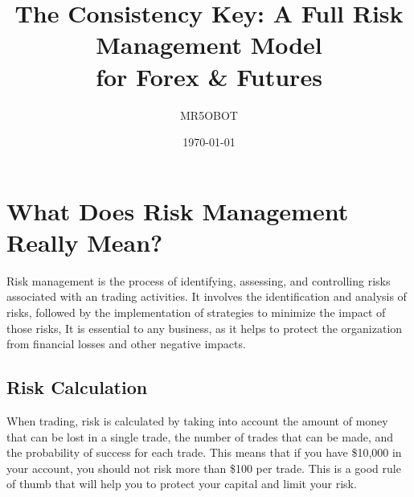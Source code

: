 \documentclass[10pt]{article}
\title{The Consistency Key: A Full Risk Management Model\\ for Forex \& Futures}
\author{MR5OBOT }
\date{\today}
\begin{document}
\maketitle
\makeatletter
\def\@makefnmark{\hbox{}}
\makeatother





\section*{What Does Risk Management Really Mean?}
\vspace{0.1cm}
\small Risk management is the process of identifying, assessing, and controlling risks associated with an trading activities. It involves the identification and analysis of risks, followed by the implementation of strategies to minimize the impact of those risks, It is essential to any business, as it helps to protect the organization from financial losses and other negative impacts.

\subsection*{Risk Calculation}
\vspace{0.1cm}
\small When trading, risk is calculated by taking into account the amount of money that can be lost in a single trade, the number of trades that can be made, and the probability of success for each trade.
\small This means that if you have \$10,000 in your account, you should not risk more than \$100 per trade. This is a good rule of thumb that will help you to protect your capital and limit your risk.
\vspace{0.1cm}
\end{document}
